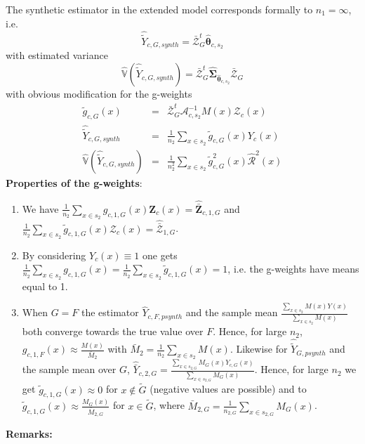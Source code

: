 \documentclass[a4paper,12pt,leqno, titlepage]{article}
\newcommand{\VAR}{\mathbb{V}}
\begin{document}
The synthetic estimator in the extended model corresponds formally to $n_1=\infty$, i.e.
\begin{equation}
\hat{\tilde{Y}}_{c,G,synth}=\bar{\pmb{\mathcal{Z}}}_G^t\hat{\pmb{\theta}}_{c,s_2}
 \end{equation}
 with estimated variance
 \begin{equation}
\hat{\VAR}(\hat{\tilde{Y}}_{c,G,synth})=
\bar{\pmb{\mathcal{Z}}}_G^t\hat{\pmb{\Sigma}}_{\hat{\pmb{\theta}}_{c,s_2}}\bar{\pmb{\mathcal{Z}}}_{G}
\end{equation}
with obvious modification for the g-weights
\begin{eqnarray}
\tilde{g}_{c,G}(x)&=&\bar{\pmb{\mathcal{Z}}}_G^t\pmb{\mathcal{A}}^{-1}_{c,s_2}M(x)
\pmb{\mathcal{Z}}_c(x)\nonumber \\
\hat{\tilde{Y}}_{c,G,synth}&=&\frac{1}{n_2}\sum_{x\in{s_2}}\tilde{g}_{c,G}(x)Y_c(x)\nonumber \\
\hat{\VAR}(\hat{\tilde{Y}}_{c,G,synth})&=&\frac{1}{n_2^2}\sum_{x\in{s_2}}
\tilde{g}^2_{c,G}(x)\hat{\mathcal{R}}^2(x)
\end{eqnarray}
\noindent
\textbf{Properties of the g-weights}:
\begin{enumerate}
\item
 We have
 $\frac{1}{n_2}\sum_{x\in{s_2}}g_{c,1,G}(x)\pmb{Z}_c(x)=
 \hat{\bar{\pmb{Z}}}_{c,1,G}$  and  $\frac{1}{n_2}\sum_{x\in{s_2}}\tilde{g}_{c,1,G}(x)\pmb{\mathcal{Z}}_c(x)=
 \hat{\bar{\pmb{\mathcal{Z}}}}_{1,G}$.
 \item
 By considering $Y_c(x)\equiv 1$ one gets
 $\frac{1}{n_2}\sum_{x\in{s_2}}g_{c,1,G}(x)=
  \frac{1}{n_2}\sum_{x\in{s_2}}\tilde{g}_{c,1,G}(x)=1$, i.e. the g-weights have means equal to 1.
 \item
  When $G=F$ the estimator $\hat{Y}_{c,F,psynth}$ and the sample mean $\frac{\sum_{x\in{s_2}}M(x)Y(x)}{\sum_{x\in{s_2}}M(x)}$ both converge towards the true value over $F$. Hence, for large $n_2$, $g_{c,1,F}(x)\approx \frac{M(x)}{\bar{M}_2}$ with $\bar{M}_2=\frac{1}{n_2}\sum_{x\in{s_2}}M(x)$. Likewise for $\hat{\tilde{Y}}_{G,psynth}$ and the sample mean over $G$, $\hat{\bar{Y}}_{c,2,G}=\frac{\sum_{x\in{s_{2,G}}}M_G(x) Y_{c,G}(x)}{\sum_{x\in{s_{2,G}}}M_G(x)}$. Hence, for large $n_2$ we get $\tilde{g}_{c,1,G}(x)\approx 0$ for $x\not\in{\tilde{G}}$ (negative values are possible) and to $\tilde{g}_{c,1,G}(x)\approx \frac{M_G(x)}{\bar{M}_{2,G}}$ for $x\in{\tilde{G}}$, where $\bar{M}_{2,G}=\frac{1}{n_{2,G}}\sum_{x\in{s_{2,G}}}M_G(x)$.
 \end{enumerate}
\textbf{Remarks:}\\
\end{document}
